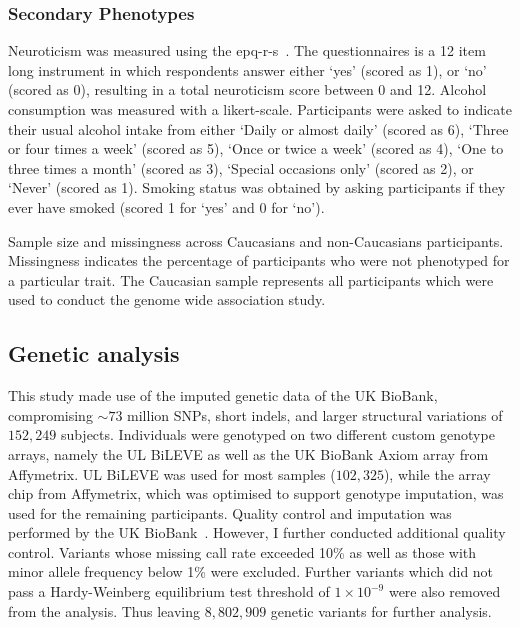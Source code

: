 \subsubsection{Secondary Phenotypes}
\label{ssub:sec_pheno}

Neuroticism was measured using the \acrfull{epq-r-s}~\cite{Eysenck1985}. 
The questionnaires is a 12 item long instrument in which respondents answer either `yes' (scored as 1), or `no' (scored as 0),
resulting in a total neuroticism score between 0 and 12.
Alcohol consumption was measured with a likert-scale.
Participants were asked to indicate their usual alcohol intake from either `Daily or almost daily' (scored as 6), `Three or four times a week' (scored as 5), `Once or twice a week' (scored as 4), `One to three times a month' (scored as 3), `Special occasions only' (scored as 2), or `Never' (scored as 1).
Smoking status was obtained by asking participants if they ever have smoked (scored 1 for `yes' and 0 for `no').


\begin{table}[!htpb]
	\centering
	\resizebox{\textwidth}{!}{}
  \caption[Sample Size and Missingness of UK BioBank]{
    Sample size and missingness across Caucasians and non-Caucasians participants.
    Missingness indicates the percentage of participants who were not phenotyped for a particular trait.
    The Caucasian sample represents all participants which were used to conduct the genome wide association study.
}\label{tab:descriptive_gwas} 
\end{table}

\subsection{Genetic analysis}
\label{sub:genetic_analysis_assoc}
This study made use of the imputed genetic data of the UK BioBank, compromising $\sim73$ million SNPs, short indels, and larger structural variations of $152,249$ subjects.
Individuals were genotyped on two different custom genotype arrays, namely the UL BiLEVE as well as the UK BioBank Axiom array from Affymetrix. 
UL BiLEVE was used for most samples ($102,325$), while the array chip from Affymetrix, which was optimised to support genotype imputation, was used for the remaining participants. 
Quality control and imputation was performed by the UK BioBank~\cite{Marchini2015}.
However, I further conducted additional quality control.
Variants whose missing call rate exceeded 10\% as well as those with minor allele frequency below 1\% were excluded.
Further variants which did not pass a Hardy-Weinberg equilibrium test threshold of $1\times10^{-9}$ were also removed from the analysis.
Thus leaving $8,802,909$ genetic variants for further analysis.

